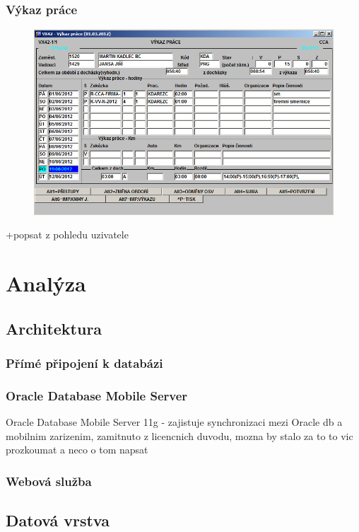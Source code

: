 \documentclass{bakalarka}
\begin{document}
\subsection{Výkaz práce}
\begin{figure}[H]
  \centering
  \includegraphics[scale=0.6]{obr/VX42.png}
  \label{}
\end{figure}
+popsat z pohledu uzivatele

\chapter{Analýza}

\section{Architektura}
\subsection{Přímé připojení k databázi}
\subsection{Oracle Database Mobile Server}
Oracle Database Mobile Server 11g - zajistuje synchronizaci mezi Oracle db a mobilnim zarizenim, zamitnuto z licencnich duvodu, mozna by stalo za to to vic prozkoumat a neco o tom napsat
\subsection{Webová služba}

\section{Datová vrstva}
\end{document}
